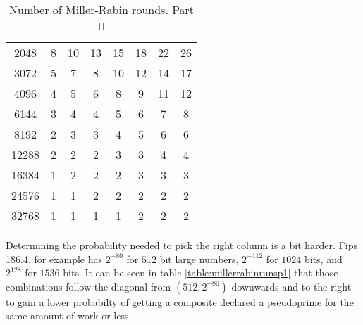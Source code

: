 \documentclass[synpaper]{book}
\begin{document}
\begin{table}[h]
\begin{center}
\begin{tabular}{c c c c c c c c}
      \\
      2048                & 8                   & 10                  & 13                  & 15  &
      18                  & 22                  & 26
      \\
      3072                & 5                   & 7                   & 8                   & 10  &
      12                  & 14                  & 17
      \\
      4096                & 4                   & 5                   & 6                   & 8   &
      9                   & 11                  & 12
      \\
      6144                & 3                   & 4                   & 4                   & 5   &
      6                   & 7                   & 8
      \\
      8192                & 2                   & 3                   & 3                   & 4   &
      5                   & 6                   & 6
      \\
      12288               & 2                   & 2                   & 2                   & 3   &
      3                   & 4                   & 4
      \\
      16384               & 1                   & 2                   & 2                   & 2   &
      3                   & 3                   & 3
      \\
      24576               & 1                   & 1                   & 2                   & 2   &
      2                   & 2                   & 2
      \\
      32768               & 1                   & 1                   & 1                   & 1   &
      2                   & 2                   & 2
    \end{tabular}
    \caption{ Number of Miller-Rabin rounds. Part II } \label{table:millerrabinrunsp2}
  \end{center}
\end{table}

Determining the probability needed to pick the right column is a bit harder. Fips 186.4, for
example has $2^{-80}$ for $512$ bit large numbers, $2^{-112}$ for $1024$ bits, and $2^{128}$ for
$1536$ bits. It can be seen in table \ref{table:millerrabinrunsp1} that those combinations follow
the diagonal from $(512,2^{-80})$ downwards and to the right to gain a lower probabilty of getting
a composite declared a pseudoprime for the same amount of work or less.
\end{document}
